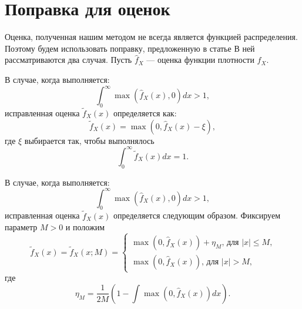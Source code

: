 \documentclass[../paper.tex]{subfiles}
\begin{document}
\section{Поправка для оценок}
Оценка, полученная нашим методом не всегда является функцией распределения.
Поэтому будем использовать поправку, предложенную в статье \cite{correction-of-density-estimation}
В ней рассматриваются два случая. Пусть $\hat{f}_X$ --- оценка функции плотности $f_X$.

В случае, когда выполняется:
\[
	\int_0^\infty \max(\hat{f}_X(x), 0) dx > 1
,\]
исправленная оценка $\tilde{f}_X(x)$ определяется как:
\[
	\tilde{f}_X(x) = \max(0, \hat{f}_X(x) - \xi),
\]
где $\xi$ выбирается так, чтобы выполнялось
\[
	\int_0^\infty \tilde{f}_X(x) dx = 1
.\]

В случае, когда выполняется:
\[
	\int_0^\infty \max(\hat{f}_X(x), 0) dx > 1
,\]
исправленная оценка $\tilde{f}_X(x)$ определяется следующим образом. Фиксируем параметр $M > 0$ и положим
\[
	\tilde{f}_X(x)
	= \tilde{f}_X(x; M) =
	\begin{cases}
		\max(0, \hat{f}_X(x)) + \eta_M \text{, для $|x| \leqslant M$,} \\
		\max(0, \hat{f}_X(x)) \text{, для $|x| > M$,}
	\end{cases}
\]
где
\[
  \eta_M = \frac{1}{2M} \left( 1 - \int \max(0, \hat{f}_X(x)) dx \right)
.\]
\end{document}
